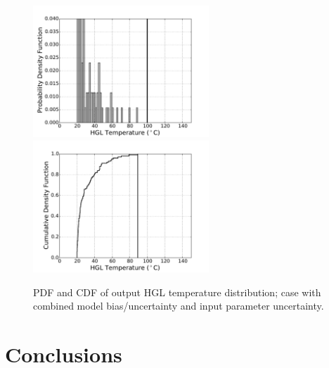 \documentclass[12pt]{article}
\begin{document}
\begin{figure}[p]
\includegraphics[width=2.6in]{Figures/output_PDF_3_combined}
\includegraphics[width=2.6in]{Figures/output_CDF_3_combined}
\caption{PDF and CDF of output HGL temperature distribution; case with combined model bias/uncertainty and input parameter uncertainty.}
\label{fig:case_3_output_distributions}
\end{figure}


\clearpage


\section{Conclusions}
\label{sec:conclusions}




\end{document}
